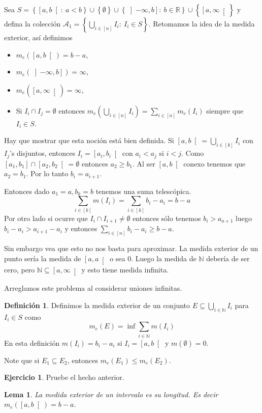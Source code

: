 \documentclass[12pt]{article}
\theoremstyle{plain}
\newtheorem{Lem}[Th]{Lema}             %
\theoremstyle{definition}
\newtheorem{Def}[Th]{Definición}       %
\newtheorem{Ej}[Th]{Ejercicio}
\theoremstyle{remark}
\numberwithin{equation}{section}
\newcommand{\bN}{\mathbb{N}}        %
\newcommand{\bR}{\mathbb{R}}        %
\newcommand{\cA}{\mathcal{A}}       %
\renewcommand{\geq}{\geqslant}      %
\renewcommand{\leq}{\leqslant}      %
\renewcommand{\:}{\colon}           %
\newcommand{\conj}[1]{\left\lbrace#1\right\rbrace}
\newcommand{\bonj}[1]{\left\lbrack#1\right\rbrack}
\newcommand{\rbonj}[1]{\left\rbrack#1\right\rbrack}
\newcommand{\lbonj}[1]{\left\lbrack#1\right\lbrack}
\begin{document}
\begin{multicols}{2}
Sea $S=\conj{\lbonj{a,b}\:\ a<b}\cup\conj{\emptyset}\cup\conj{\rbonj{-\infty,b}\:\ b\in\bR}\cup\conj{\lbonj{a,\infty}}$ y defina la colección $\cA_1=\conj{\bigcup_{i\in\bonj{n}}I_i\:\ I_i\in S}$. Retomamos la idea de la medida exterior, así definimos
\begin{center}
\begin{itemize}
  \item $m_e(\lbonj{a,b})=b-a$,
  \item $m_e(\rbonj{-\infty,b})=\infty$,
  \item $m_e(\lbonj{a,\infty})=\infty$,
  \item Si $I_i\cap I_j=\emptyset$ entonces $m_e\left(\bigcup_{i\in\bonj{n}}I_i\right)=\sum_{i\in\bonj{n}}m_e(I_i)$ siempre que $I_i\in S$.
\end{itemize}
\end{center}
Hay que mostrar que esta noción está bien definida. Si $\lbonj{a,b}=\bigcup_{i\in\bonj{k}}I_i$ con $I_j$'s disjuntos, entonces $I_i=\lbonj{a_i,b_i}$ con $a_i<a_j$ si $i<j$. Como $\bonj{a_1,b_1}\cap\lbonj{a_2,b_2}=\emptyset$ entonces $a_2\geq b_1$. Al ser $\lbonj{a,b}$ conexo tenemos que $a_2=b_1$. Por lo tanto $b_i=a_{i+1}$. \par
Entonces dado $a_1=a, b_k=b$ tenemos una suma telescópica.
$$\sum_{i\in\bonj{k}}m(I_i)=\sum_{i\in\bonj{k}}b_i-a_i=b-a$$
Por otro lado si ocurre que $I_i\cap I_{i+1}\neq\emptyset$ entonces sólo tenemos $b_i>a_{a+1}$ luego $b_i-a_i>a_{i+1}-a_i$ y entonces $\sum_{i\in\bonj{n}}b_i-a_i\geq b-a$. \par
Sin embargo vea que esto no nos basta para aproximar. La medida exterior de un punto sería la medida de $\lbonj{a,a}$ o sea 0. Luego la medida de $\bN$ debería de ser cero, pero $\bN\subseteq\lbonj{a,\infty}$ y esto tiene medida infinita.\par
Arreglamos este problema al considerar uniones infinitas.
\begin{Def}
  Definimos la medida exterior de un conjunto $E\subseteq\bigcup_{i\in\bN}I_i$ para $I_i\in S$ como
  $$m_e(E)=\inf\sum_{i\in\bN}m(I_i)$$
  En esta definición $m(I_i)=b_i-a_i$ si $I_i=\lbonj{a,b}$ y $m(\emptyset)=0$.
\end{Def}

Note que si $E_1\subseteq E_2$, entonces $m_e(E_1)\leq m_e(E_2)$.

\begin{Ej}
  Pruebe el hecho anterior.
\end{Ej}

\begin{Lem}
  La medida exterior de un intervalo es su longitud. Es decir $m_e(\lbonj{a,b})=b-a$.
\end{Lem}


\end{multicols}
\end{document}
